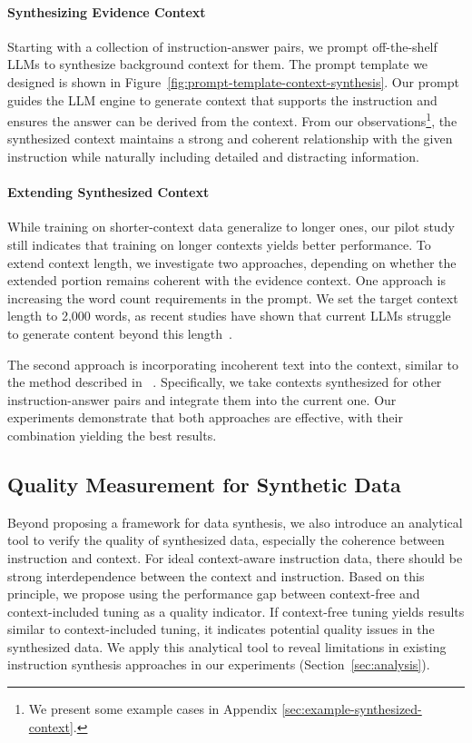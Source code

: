 \noindent\paragraph{Synthesizing Evidence Context}
Starting with a collection of instruction-answer pairs, we prompt off-the-shelf LLMs to synthesize background context for them.
The prompt template we designed is shown in Figure~\ref{fig:prompt-template-context-synthesis}.
Our prompt guides the LLM engine to generate context that supports the instruction and ensures the answer can be derived from the context.
From our observations\footnote{We present some example cases in Appendix \ref{sec:example-synthesized-context}.}, the synthesized context maintains a strong and coherent relationship with the given instruction while naturally including detailed and distracting information.

\noindent\paragraph{Extending Synthesized Context}
While training on shorter-context data generalize to longer ones, our pilot study still indicates that training on longer contexts yields better performance.
To extend context length, we investigate two approaches, depending on whether the extended portion remains coherent with the evidence context.
One approach is increasing the word count requirements in the prompt.
We set the target context length to 2,000 words, as recent studies have shown that current LLMs struggle to generate content beyond this length~\cite{bai2024longwriter,pham2024suri,quan2024language}.

The second approach is incorporating incoherent text into the context, similar to the method described in ~\citet{dubey2024llama}.
Specifically, we take contexts synthesized for other instruction-answer pairs and integrate them into the current one.
Our experiments demonstrate that both approaches are effective, with their combination yielding the best results.

\subsection{Quality Measurement for Synthetic Data}
\label{sec:context-free-tuning}
Beyond proposing a framework for data synthesis, we also introduce an analytical tool to verify the quality of synthesized data, especially the coherence between instruction and context.
For ideal context-aware instruction data, there should be strong interdependence between the context and instruction.
Based on this principle, we propose using the performance gap between context-free and context-included tuning as a quality indicator.
If context-free tuning yields results similar to context-included tuning, it indicates potential quality issues in the synthesized data.
We apply this analytical tool to reveal limitations in existing instruction synthesis approaches in our experiments (Section~\ref{sec:analysis}).